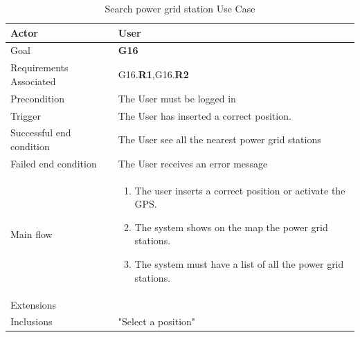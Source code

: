 \newline
\begin{table}[htb]
\begin{center}
\renewcommand{\arraystretch}{1.5}
\begin{tabular}{|l|p{}|}
\hline
Actor & User \\ \hline
Goal & \textbf{G16} \\ \hline
Requirements Associated & G16.\textbf{R1},G16.\textbf{R2} \\ \hline
Precondition & The User must be logged in \\ \hline
Trigger & The User has inserted a correct position. \\ \hline
Successful end condition & The User see all the nearest power grid stations \\ \hline
Failed end condition & The User receives an error message \\ \hline
Main flow & \begin{minipage}[t]{0.6\textwidth}
\begin{enumerate}
\addtolength{\itemindent}{0.5cm}
\item The user inserts a correct position or activate the GPS.
\item The system shows on the map the power grid stations.
\item The system must have a list of all the power grid stations.
\end{enumerate}
\end{minipage} \\ \hline
Extensions & \\ \hline
Inclusions & "Select a position" \\ \hline
\end{tabular}
\caption{Search power grid station Use Case}
\end{center}
\end{table}
\clearpage

